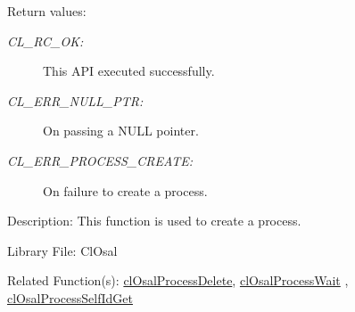 \begin{Desc}
\item[Return values:]
\begin{description}
\item[{\em CL\_\-RC\_\-OK:}]This API executed successfully. \item[{\em CL\_\-ERR\_\-NULL\_\-PTR:}]On passing a NULL pointer. \item[{\em CL\_\-ERR\_\-PROCESS\_\-CREATE:}]On failure to create a process.\end{description}
\end{Desc}
\begin{Desc}
\item[Description:]This function is used to create a process.\end{Desc}
\begin{Desc}
\item[Library File:]Cl\-Osal\end{Desc}
\begin{Desc}
\item[Related Function(s):]\hyperlink{pageosal142}{cl\-Osal\-Process\-Delete}, \hyperlink{pageosal143}{cl\-Osal\-Process\-Wait} , 
\hyperlink{pageosal144}{cl\-Osal\-Process\-Self\-Id\-Get} \end{Desc}




\newpage

